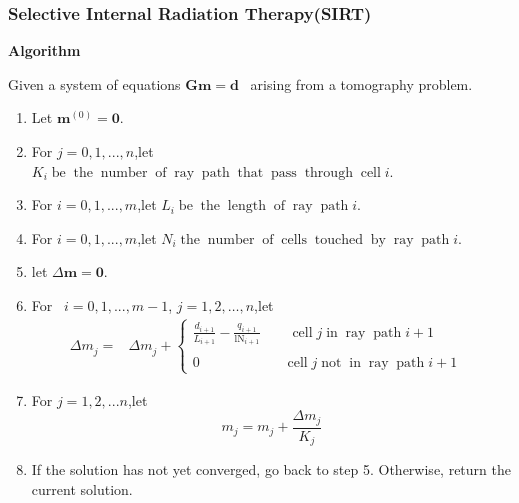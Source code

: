 \documentclass[a4paper]{article}
\newcommand{\tmmathbf}[1]{\ensuremath{\boldsymbol{#1}}}
\newcommand{\tmop}[1]{\ensuremath{\operatorname{#1}}}
\newcommand{\tmtextbf}[1]{{\bfseries{#1}}}
\newcommand{\tmtextup}[1]{{\upshape{#1}}}
\newenvironment{enumeratenumeric}{\begin{enumerate}[1.] }{\end{enumerate}}
\newenvironment{tmindent}{\begin{tmparmod}{1.5em}{0pt}{0pt} }{\end{tmparmod}}
\newenvironment{tmparmod}[3]{\begin{list}{}{\setlength{\topsep}{0pt}\setlength{\leftmargin}{#1}\setlength{\rightmargin}{#2}\setlength{\parindent}{#3}\setlength{\listparindent}{\parindent}\setlength{\itemindent}{\parindent}\setlength{\parsep}{\parskip}} \item[]}{\end{list}}
\newenvironment{tmparsep}[1]{\begingroup\setlength{\parskip}{#1}}{\endgroup}
\begin{document}
\subsubsection{Selective Internal Radiation Therapy(SIRT)}

{\noindent}\begin{tmparsep}{0em}
  \tmtextbf{Algorithm \tmtextup{3}}{\smallskip}
  \begin{tmindent}
    Given a system of equations $\tmmathbf{G}\tmmathbf{m}=\tmmathbf{d}$ \
    arising from a tomography problem.
    \begin{enumeratenumeric}
      \item Let $\tmmathbf{m}^{(0)} =\tmmathbf{0}$.

      \item For $j = 0, 1, ..., n$,let $K_i \tmop{be} \tmop{the} \tmop{number}
      \tmop{of} \tmop{ray} \tmop{path} \tmop{that} \tmop{pass} \tmop{through}
      \tmop{cell} i.$

      \item For $i = 0, 1, ..., m$,let $L_i \tmop{be} \tmop{the} \tmop{length}
      \tmop{of} \tmop{ray} \tmop{path} i.$

      \item For $i = 0, 1, ..., m$,let $N_i \tmop{the} \tmop{number} \tmop{of}
      \tmop{cells} \tmop{touched} \tmop{by} \tmop{ray} \tmop{path} i.$

      \item let $\Delta \tmmathbf{m}=\tmmathbf{0}.$

      \item For \ $i = 0, 1, ..., m - 1$, $j = 1, 2, \ldots, n$,let
      \begin{eqnarray}
        \Delta m_j^{} = & \Delta m_j^{} + \left\{ \begin{array}{l}
          \frac{d_{i + 1}}{L_{i + 1}} - \frac{q_{i + 1}}{\tmop{lN}_{i + 1}}
          \hspace{2em} \tmop{cell} j \tmop{in} \tmop{ray} \tmop{path} i + 1\\
          \\
          0 \hspace{2em} \hspace{2em} \hspace{2em} \tmop{cell} j \tmop{not}
          \tmop{in} \tmop{ray} \tmop{path} i + 1
        \end{array} \right. &
      \end{eqnarray}
      \item For $j = 1, 2, ...n$,let
      \begin{equation}
        m_j = m_j + \frac{\Delta m_j}{K_j}
      \end{equation}
      \item If the solution has not yet converged, go back to step 5.
      Otherwise, return the current solution.
    \end{enumeratenumeric}
  \end{tmindent}
\end{tmparsep}{\hspace*{\fill}}{\medskip}
\end{document}
